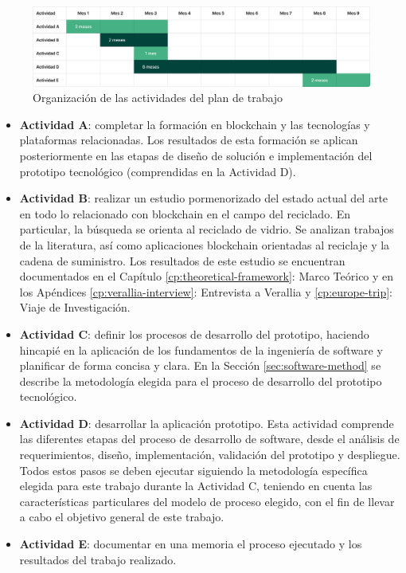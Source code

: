 \begin{figure}[!htb]
    \centering
    \includegraphics[width=\textwidth]{Figures/activities-plan.png}
    \caption{Organización de las actividades del plan de trabajo}
    \label{fig:activities-plan}
\end{figure}

\begin{itemize}
	\item \textbf{Actividad A}: completar la formación en blockchain y las tecnologías y plataformas relacionadas. Los resultados de esta formación se aplican posteriormente en las etapas de diseño de solución e implementación del prototipo tecnológico (comprendidas en la Actividad D).
	\item \textbf{Actividad B}: realizar un estudio pormenorizado del estado actual del arte en todo lo relacionado con blockchain en el campo del reciclado. En particular, la búsqueda se orienta al reciclado de vidrio. Se analizan trabajos de la literatura, así como aplicaciones blockchain orientadas al reciclaje y la cadena de suministro. Los resultados de este estudio se encuentran documentados en el Capítulo \ref{cp:theoretical-framework}: Marco Teórico y en los Apéndices \ref{cp:verallia-interview}: Entrevista a Verallia y \ref{cp:europe-trip}: Viaje de Investigación.
	\item \textbf{Actividad C}: definir los procesos de desarrollo del prototipo, haciendo hincapié en la aplicación de los fundamentos de la ingeniería de software y planificar de forma concisa y clara. En la Sección \ref{sec:software-method} se describe la metodología elegida para el proceso de desarrollo del prototipo tecnológico.
	\item \textbf{Actividad D}: desarrollar la aplicación prototipo. Esta actividad comprende las diferentes etapas del proceso de desarrollo de software, desde el análisis de requerimientos, diseño, implementación, validación del prototipo y despliegue. Todos estos pasos se deben ejecutar siguiendo la metodología específica elegida para este trabajo durante la Actividad C, teniendo en cuenta las características particulares del modelo de proceso elegido, con el fin de llevar a cabo el objetivo general de este trabajo.
	\item \textbf{Actividad E}: documentar en una memoria el proceso ejecutado y los resultados del trabajo realizado.
\end{itemize}

